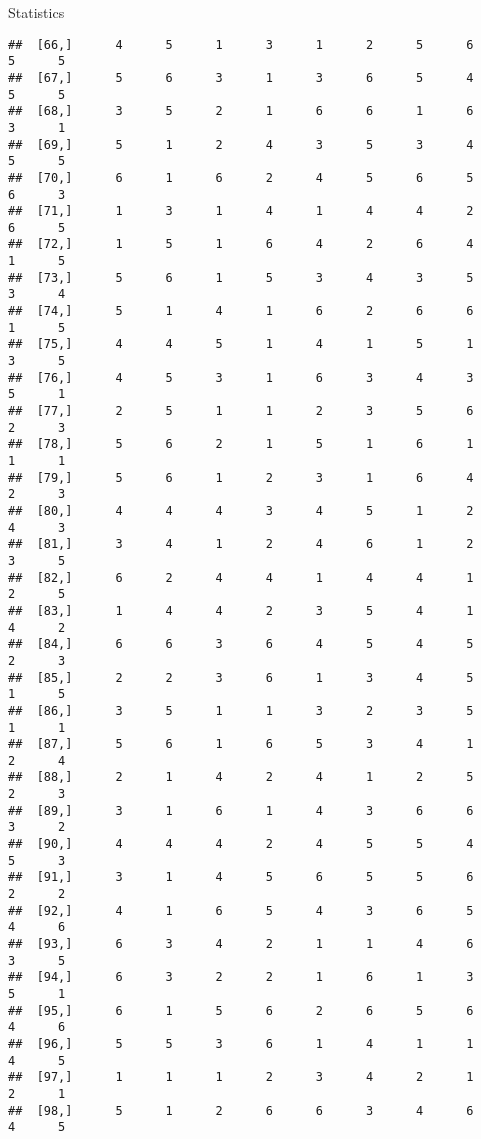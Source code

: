 \documentclass[
  ignorenonframetext,
]{beamer}
\begin{document}
\begin{frame}[fragile]{Statistics}
\begin{verbatim}
##  [66,]      4      5      1      3      1      2      5      6      5      5
##  [67,]      5      6      3      1      3      6      5      4      5      5
##  [68,]      3      5      2      1      6      6      1      6      3      1
##  [69,]      5      1      2      4      3      5      3      4      5      5
##  [70,]      6      1      6      2      4      5      6      5      6      3
##  [71,]      1      3      1      4      1      4      4      2      6      5
##  [72,]      1      5      1      6      4      2      6      4      1      5
##  [73,]      5      6      1      5      3      4      3      5      3      4
##  [74,]      5      1      4      1      6      2      6      6      1      5
##  [75,]      4      4      5      1      4      1      5      1      3      5
##  [76,]      4      5      3      1      6      3      4      3      5      1
##  [77,]      2      5      1      1      2      3      5      6      2      3
##  [78,]      5      6      2      1      5      1      6      1      1      1
##  [79,]      5      6      1      2      3      1      6      4      2      3
##  [80,]      4      4      4      3      4      5      1      2      4      3
##  [81,]      3      4      1      2      4      6      1      2      3      5
##  [82,]      6      2      4      4      1      4      4      1      2      5
##  [83,]      1      4      4      2      3      5      4      1      4      2
##  [84,]      6      6      3      6      4      5      4      5      2      3
##  [85,]      2      2      3      6      1      3      4      5      1      5
##  [86,]      3      5      1      1      3      2      3      5      1      1
##  [87,]      5      6      1      6      5      3      4      1      2      4
##  [88,]      2      1      4      2      4      1      2      5      2      3
##  [89,]      3      1      6      1      4      3      6      6      3      2
##  [90,]      4      4      4      2      4      5      5      4      5      3
##  [91,]      3      1      4      5      6      5      5      6      2      2
##  [92,]      4      1      6      5      4      3      6      5      4      6
##  [93,]      6      3      4      2      1      1      4      6      3      5
##  [94,]      6      3      2      2      1      6      1      3      5      1
##  [95,]      6      1      5      6      2      6      5      6      4      6
##  [96,]      5      5      3      6      1      4      1      1      4      5
##  [97,]      1      1      1      2      3      4      2      1      2      1
##  [98,]      5      1      2      6      6      3      4      6      4      5

\end{verbatim}
\end{frame}
\end{document}

